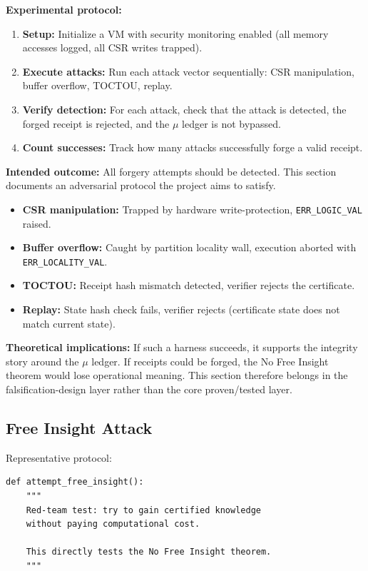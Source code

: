\textbf{Experimental protocol:}
\begin{enumerate}
    \item \textbf{Setup:} Initialize a VM with security monitoring enabled (all memory accesses logged, all CSR writes trapped).
    
    \item \textbf{Execute attacks:} Run each attack vector sequentially: CSR manipulation, buffer overflow, TOCTOU, replay.
    
    \item \textbf{Verify detection:} For each attack, check that the attack is detected, the forged receipt is rejected, and the $\mu$ ledger is not bypassed.
    
    \item \textbf{Count successes:} Track how many attacks successfully forge a valid receipt.
\end{enumerate}

\textbf{Intended outcome:} All forgery attempts should be detected. This section documents an adversarial protocol the project aims to satisfy.
\begin{itemize}
    \item \textbf{CSR manipulation:} Trapped by hardware write-protection, \texttt{ERR\_LOGIC\_VAL} raised.
    \item \textbf{Buffer overflow:} Caught by partition locality wall, execution aborted with \texttt{ERR\_LOCALITY\_VAL}.
    \item \textbf{TOCTOU:} Receipt hash mismatch detected, verifier rejects the certificate.
    \item \textbf{Replay:} State hash check fails, verifier rejects (certificate state does not match current state).
\end{itemize}

\textbf{Theoretical implications:} If such a harness succeeds, it supports the integrity story around the $\mu$ ledger. If receipts could be forged, the No Free Insight theorem would lose operational meaning. This section therefore belongs in the falsification-design layer rather than the core proven/tested layer.


\subsection{Free Insight Attack}

Representative protocol:
\begin{lstlisting}
def attempt_free_insight():
    """
    Red-team test: try to gain certified knowledge
    without paying computational cost.
    
    This directly tests the No Free Insight theorem.
    """
\end{lstlisting}

